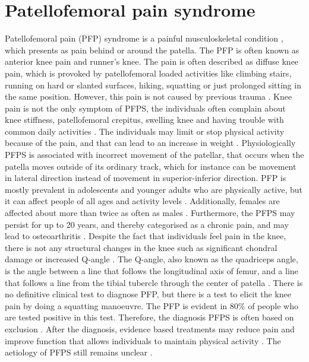 \section{Patellofemoral pain syndrome}
Patellofemoral pain (PFP) syndrome is a painful musculoskeletal condition \citep{Maclachlan2017, Smith2015}, which presents as pain behind or around the patella. The PFP is often known as anterior knee pain and runner’s knee. The pain is often described as diffuse knee pain, which is provoked by patellofemoral loaded activities like climbing stairs, running on hard or slanted surfaces, hiking, squatting or just prolonged sitting in the same position.\citep{Smith2015, Crossley2016, Boudreau2017, Crossley2015} However, this pain is not caused by previous trauma \citep{Crossley2016}.
Knee pain is not the only symptom of PFPS, the individuals often complain about knee stiffness, patellofemoral crepitus, swelling knee and having trouble with common daily activities \citep{Crossley2016, Martini2012}. The individuals may limit or stop physical activity because of the pain, and that can lead to an increase in weight \citep{Petersen2013, Crossley2016}.\newline
\noindent
Physiologically PFPS is associated with incorrect movement of the patellar, that occurs when the patella moves outside of its ordinary track, which for instance can be movement in lateral direction instead of movement in superior-inferior direction.\citep{Martini2012} \newline
\noindent
PFP is mostly prevalent in adolescents and younger adults who are physically active, but it can affect people of all ages and activity levels \citep{Maclachlan2017, Crossley2016, Crossley2015}. Additionally,  females are affected about more than twice as often as males \citep{Petersen2013}. Furthermore, the PFPS may persist for up to 20 years, and thereby categorised as a chronic pain, and may lead to osteoarthritis \citep{Petersen2013, Crossley2016}.\newline
\noindent
Despite the fact that individuals feel pain in the knee, there is not any structural changes in the knee such as significant chondral damage or increased Q-angle \citep{Petersen2013}. The Q-angle, also known as the quadriceps angle, is the angle between a line that follows the longitudinal axis of femur, and a line that follows a line from the tibial tubercle through the center of patella \citep{Dahab2011}. \newline
\noindent
There is no definitive clinical test to diagnose PFP, but there is a test to elicit the knee pain by doing a squatting manoeuvre. The PFP is evident in 80\% of people who are tested positive in this test.\citep{Crossley2016, Crossley2015} Therefore, the diagnosis PFPS is often based on exclusion \citep{Petersen2013}. After the diagnosis, evidence based treatments may reduce pain and improve function that allows individuals to maintain physical activity \citep{Crossley2015}.
The aetiology of PFPS still remains unclear \citep{Smith2015}.

